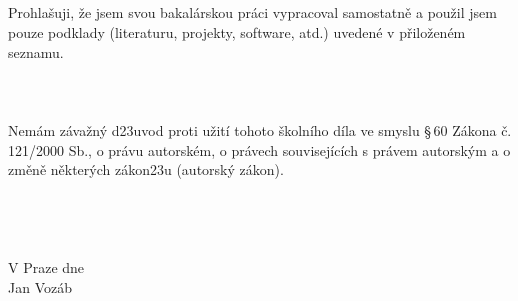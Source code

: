 \newpage
\null\vfill \thispagestyle{empty}
 \\
\\
\\
\\
Prohla\v suji, \v ze jsem svou bakalárskou práci vypracoval samostatn\v e a
pou\v zil jsem pouze podklady (literaturu, projekty, software, atd.) uveden\' e v
p\v rilo\v zen\' em seznamu. \\
\\
\\
\\
Nem\' am z\' ava\v zn\'y d\accent23uvod proti u\v zit\' i tohoto \v skoln\' iho d\' ila ve smyslu \S\,60
Z\' akona \v c. 121/2000 Sb., o pr\' avu autorsk\' em, o pr\' avech souvisej\' ic\' ich s
pr\' avem autorsk\' ym a o zm\v en\v e n\v ekter\' ych z\'akon\accent23u (autorsk\'y z\' akon). \\
\\
\\
\\
\\
{V Praze dne}
\\
\indent\hspace{275pt} Jan Voz\' ab
%
%
%
%
\newpage
